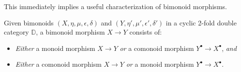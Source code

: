 This immediately implies a useful characterization of bimonoid morphisms.

\begin{corollary}\label{Lem:BimonMorphism}
	Given bimonoids $(X,\eta,\mu,\epsilon,\delta)$ and $(Y,\eta',\mu',\epsilon',\delta')$ in a cyclic 2-fold double category $\mathbb{D}$, a bimonoid morphism $X\to Y$ consists of:
	\begin{itemize}
		\item \emph{Either} a monoid morphism $X\to Y$ \emph{or} a comonoid morphism $Y^{\bullet}\to X^{\bullet}$, \emph{and}
		\item \emph{Either} a comonoid morphism $X\to Y$ \emph{or} a monoid morphism $Y^{\bullet}\to X^{\bullet}$.
	\end{itemize}
\end{corollary}